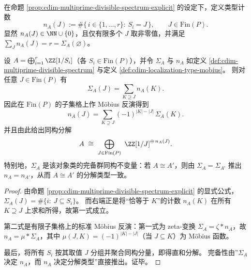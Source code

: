 \begin{definition}\label{def:cdim-localization-type-mobius}
在命题 \ref{prop:cdim-multiprime-divisible-spectrum-explicit} 的设定下，定义类型计数
\[
n_A(J):=\#\{\,i\in\{1,\dots,r\}:\ S_i=J\,\},
\qquad
J\in\mathrm{Fin}(P).
\]
显然 \(n_A(J)\in\NN\cup\{0\}\)，且仅有限多个 \(J\) 取非零值，并满足 \(\sum_{J} n_A(J)=r=\Sigma_A(\varnothing)\)。
\end{definition}

\begin{theorem}\label{thm:cdim-mobius-inversion-localization-multiset-classification}
设 \(A=\bigoplus_{i=1}^{r}\ZZ[1/S_i]\)（各 \(S_i\in\mathrm{Fin}(P)\)），并令 \(\Sigma_A\) 与 \(n_A\) 如定义 \ref{def:cdim-multiprime-divisible-spectrum} 与定义 \ref{def:cdim-localization-type-mobius}。
则对任意 \(J\in\mathrm{Fin}(P)\) 有
\[
\Sigma_A(J)=\sum_{K\supseteq J} n_A(K).
\]
因此在 \(\mathrm{Fin}(P)\) 的子集格上作 Möbius 反演得到
\[
n_A(J)=\sum_{K\supseteq J}(-1)^{|K|-|J|}\,\Sigma_A(K).
\]
并且由此给出同构分解
\[
A\ \cong\ \bigoplus_{J\in\mathrm{Fin}(P)}\ \ZZ[1/J]^{\oplus\,n_A(J)}.
\]
特别地，\(\Sigma_A\) 是该对象类的完备群同构不变量：若 \(A\cong A'\)，则由 \(\Sigma_A=\Sigma_{A'}\) 推出 \(n_A=n_{A'}\)，从而 \(A\cong A'\) 的分解类型一致。
\end{theorem}

\begin{proof}
由命题 \ref{prop:cdim-multiprime-divisible-spectrum-explicit} 的显式公式，
\(\Sigma_A(J)=\#\{i:\ J\subseteq S_i\}\)。
而右端正是将“恰等于 \(K\)”的计数 \(n_A(K)\) 在所有 \(K\supseteq J\) 上求和所得，故第一式成立。
\par
第二式是有限子集格上的标准 Möbius 反演：第一式为 zeta-变换 \(\Sigma_A=\zeta\ast n_A\)，故 \(n_A=\mu\ast\Sigma_A\)，其中 \(\mu(J,K)=(-1)^{|K|-|J|}\)（当 \(J\subseteq K\)）为 Möbius 函数。
\par
最后，将所有 \(S_i\) 按其取值 \(J\) 分组并聚合同构分量，即得直和分解。
完备性由”\(\Sigma_A\) 决定 \(n_A\)，而 \(n_A\) 决定分解类型”直接推出。证毕。
\end{proof}

